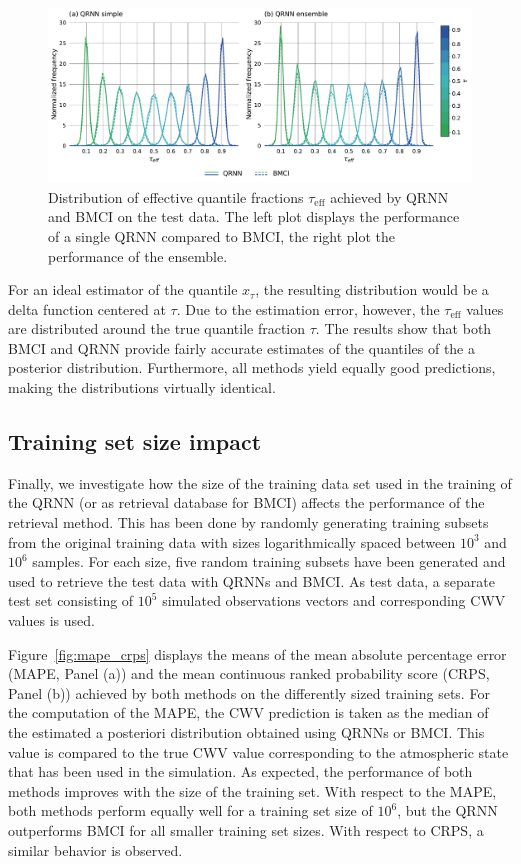 \documentclass[journal abbreviation, manuscript]{copernicus}
\begin{document}
  \begin{figure}[hbpt!]
    \centering
    \includegraphics[width = 0.8\linewidth]{../plots/fig04}
    \caption{Distribution of effective quantile fractions $\tau_\text{eff}$ achieved by
      QRNN and BMCI on the test data. The left plot displays the performance of a
      single QRNN compared to BMCI, the right plot the performance of the ensemble.}
    \label{fig:quantile_fractions}
  \end{figure}

  For an ideal estimator of the quantile $x_\tau$, the resulting distribution
  would be a delta function centered at $\tau$. Due to the estimation error,
  however, the $\tau_{\text{eff}}$ values are distributed around the true quantile
  fraction $\tau$. The results show that both BMCI and QRNN provide fairly
  accurate estimates of the quantiles of the a posterior distribution. Furthermore,
  all methods  yield equally good predictions, making the distributions virtually
  identical.

\subsection{Training set size impact}

Finally, we investigate how the size of the training data set used in the training
of the QRNN (or as retrieval database for BMCI) affects the performance of the
retrieval method. This has been done by randomly generating training subsets
from the original training data with sizes logarithmically spaced between $10^3$
and $10^6$ samples. For each size, five random training subsets have been
generated and used to retrieve the test data with QRNNs and BMCI. As test data,
a separate test set consisting of $10^5$ simulated observations vectors and
corresponding CWV values is used.

Figure~\ref{fig:mape_crps} displays the means of the mean absolute percentage
error (MAPE, Panel (a)) and the mean continuous ranked probability score (CRPS,
Panel (b)) achieved by both methods on the differently sized training sets.
For the computation of the MAPE, the CWV prediction is taken as the median of
the estimated a posteriori distribution obtained using QRNNs or BMCI. This value
is compared to the true CWV value corresponding to the atmospheric state that
has been used in the simulation. As expected, the performance of both methods
improves with the size of the training set. With respect to the MAPE, both
methods perform equally well for a training set size of $10^6$, but the QRNN
outperforms BMCI for all smaller training set sizes. With respect to CRPS, a
similar behavior is observed.
\end{document}
